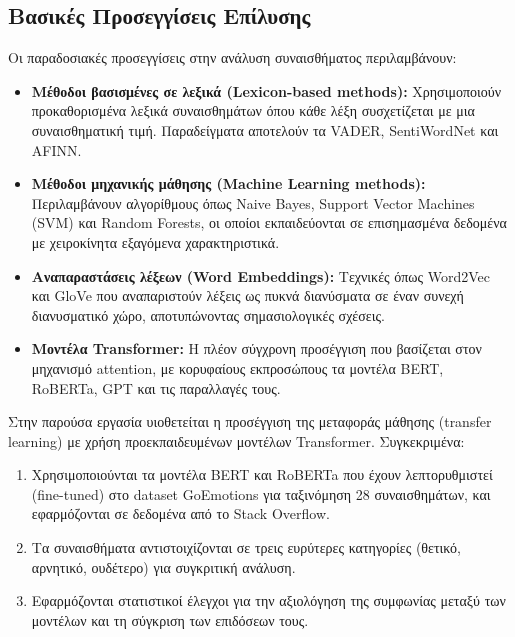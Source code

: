 \documentclass[a4paper,11pt,oneside,openany]{ioniothesis}
\begin{document}
\subsection{Βασικές Προσεγγίσεις Επίλυσης}
\label{sec:Βασικές Προσεγγίσεις Επίλυσής}

Οι παραδοσιακές προσεγγίσεις στην ανάλυση συναισθήματος περιλαμβάνουν:

\begin{itemize}
    \item \textbf{Μέθοδοι βασισμένες σε λεξικά (Lexicon-based methods):} Χρησιμοποιούν προκαθορισμένα λεξικά συναισθημάτων όπου κάθε λέξη συσχετίζεται με μια συναισθηματική τιμή. Παραδείγματα αποτελούν τα VADER, SentiWordNet και AFINN.
    
    \item \textbf{Μέθοδοι μηχανικής μάθησης (Machine Learning methods):} Περιλαμβάνουν αλγορίθμους όπως Naive Bayes, Support Vector Machines (SVM) και Random Forests, οι οποίοι εκπαιδεύονται σε επισημασμένα δεδομένα με χειροκίνητα εξαγόμενα χαρακτηριστικά.
    
    \item \textbf{Αναπαραστάσεις λέξεων (Word Embeddings):} Τεχνικές όπως Word2Vec και GloVe που αναπαριστούν λέξεις ως πυκνά διανύσματα σε έναν συνεχή διανυσματικό χώρο, αποτυπώνοντας σημασιολογικές σχέσεις.
    
    \item \textbf{Μοντέλα Transformer:} Η πλέον σύγχρονη προσέγγιση που βασίζεται στον μηχανισμό attention, με κορυφαίους εκπροσώπους τα μοντέλα BERT, RoBERTa, GPT και τις παραλλαγές τους.
\end{itemize}

Στην παρούσα εργασία υιοθετείται η προσέγγιση της μεταφοράς μάθησης (transfer learning) με χρήση προεκπαιδευμένων μοντέλων Transformer. Συγκεκριμένα:

\begin{enumerate}
    \item Χρησιμοποιούνται τα μοντέλα BERT και RoBERTa που έχουν λεπτορυθμιστεί 
(fine-tuned) στο dataset GoEmotions για ταξινόμηση 28 συναισθημάτων, 
και εφαρμόζονται σε δεδομένα από το Stack Overflow.
    
    \item Τα συναισθήματα αντιστοιχίζονται σε τρεις ευρύτερες κατηγορίες (θετικό, αρνητικό, ουδέτερο) για συγκριτική ανάλυση.
    
    \item Εφαρμόζονται στατιστικοί έλεγχοι για την αξιολόγηση της συμφωνίας μεταξύ των μοντέλων και τη σύγκριση των επιδόσεων τους.
\end{enumerate}
\end{document}
